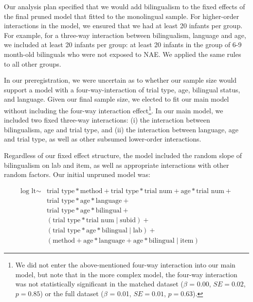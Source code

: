 \documentclass[english,,man,floatsintext]{apa6}
\begin{document}
Our analysis plan specified that we would add bilingualism to the fixed effects of the final pruned model that fitted to the monolingual sample. For higher-order interactions in the model, we ensured that we had at least 20 infants per group. For example, for a three-way interaction between bilingualism, language and age, we included at least 20 infants per group: at least 20 infants in the group of 6-9 month-old bilinguals who were not exposed to NAE. We applied the same rules to all other groups.

In our preregistration, we were uncertain as to whether our sample size would support a model with a four-way-interaction of trial type, age, bilingual status, and language. Given our final sample size, we elected to fit our main model without including the four-way interaction effect\footnote{We did not enter the above-mentioned four-way interaction into our main model, but note that in the more complex model, the four-way interaction was not statistically significant in the matched dataset ($\beta$ = 0.00, $SE = 0.02$, $p = 0.85$) or the full dataset ($\beta$ = 0.01, $SE = 0.01$, $p = 0.63$).}. In our main model, we included two fixed three-way interactions: (i) the interaction between bilingualism, age and trial type, and (ii) the interaction between language, age and trial type, as well as other subsumed lower-order interactions.

Regardless of our fixed effect structure, the model included the random slope of bilingualism on lab and item, as well as appropriate interactions with other random factors. Our initial unpruned model was:

\begin{equation}
\begin{split}
\text{log lt} \sim & \text{trial type} * \text{method} + \text{trial type} * \text{trial num} + \text{age} * \text{trial num} + \\
& \text{trial type} * \text{age} * \text{language} + \\
& \text{trial type} * \text{age} * \text{bilingual} + \\
& (\text{trial type} * \text{trial num} \mid \text{subid}) + \\
& (\text{trial type} * \text{age} * \text{bilingual} \mid \text{lab}) + \\
& (\text{method} + \text{age} * \text{language} + \text{age} * \text{bilingual} \mid \text{item})
\end{split}
\end{equation}
\end{document}
